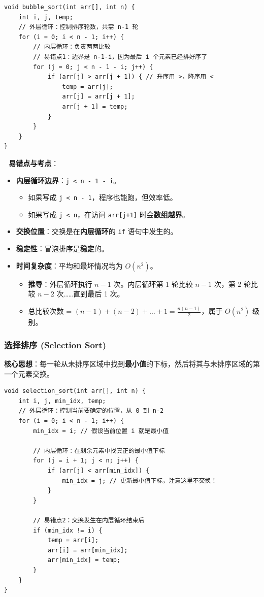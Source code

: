 \documentclass[a4paper,12pt]{article}
\begin{document}
\begin{lstlisting}
void bubble_sort(int arr[], int n) {
    int i, j, temp;
    // 外层循环：控制排序轮数，共需 n-1 轮
    for (i = 0; i < n - 1; i++) {
        // 内层循环：负责两两比较
        // 易错点1：边界是 n-1-i，因为最后 i 个元素已经排好序了
        for (j = 0; j < n - 1 - i; j++) {
            if (arr[j] > arr[j + 1]) { // 升序用 >，降序用 <
                temp = arr[j];
                arr[j] = arr[j + 1];
                arr[j + 1] = temp;
            }
        }
    }
}
\end{lstlisting}

\textbf{🔴 易错点与考点}：
\begin{itemize}
    \item \textbf{内层循环边界}：\texttt{j < n - 1 - i}。
    \begin{itemize}
        \item 如果写成 \texttt{j < n - 1}，程序也能跑，但效率低。
        \item 如果写成 \texttt{j < n}，在访问 \texttt{arr[j+1]} 时会\textbf{数组越界}。
    \end{itemize}
    \item \textbf{交换位置}：交换是在\textbf{内层循环}的 \texttt{if} 语句中发生的。
    \item \textbf{稳定性}：冒泡排序是\textbf{稳定}的。
    \item \textbf{时间复杂度}：平均和最坏情况均为 $O(n^2)$。
    \begin{itemize}
        \item \textbf{推导}：外层循环执行 $n-1$ 次。内层循环第 1 轮比较 $n-1$ 次，第 2 轮比较 $n-2$ 次……直到最后 1 次。
        \item 总比较次数 = $(n-1) + (n-2) + \dots + 1 = \frac{n(n-1)}{2}$，属于 $O(n^2)$ 级别。
    \end{itemize}
\end{itemize}

\subsubsection{选择排序 (Selection Sort)}
\textbf{核心思想}：每一轮从未排序区域中找到\textbf{最小值}的下标，然后将其与未排序区域的第一个元素交换。

\begin{lstlisting}
void selection_sort(int arr[], int n) {
    int i, j, min_idx, temp;
    // 外层循环：控制当前要确定的位置，从 0 到 n-2
    for (i = 0; i < n - 1; i++) {
        min_idx = i; // 假设当前位置 i 就是最小值
        
        // 内层循环：在剩余元素中找真正的最小值下标
        for (j = i + 1; j < n; j++) {
            if (arr[j] < arr[min_idx]) {
                min_idx = j; // 更新最小值下标，注意这里不交换！
            }
        }
        
        // 易错点2：交换发生在内层循环结束后
        if (min_idx != i) {
            temp = arr[i];
            arr[i] = arr[min_idx];
            arr[min_idx] = temp;
        }
    }
}
\end{lstlisting}
\end{document}
